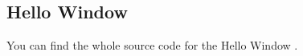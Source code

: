 \subsection{Hello Window}

You can find the whole source code for the Hello Window \href{https://learnopengl.com/code_viewer_gh.php?code=src/1.getting_started/1.2.hello_window_clear/hello_window_clear.cpp}{}.